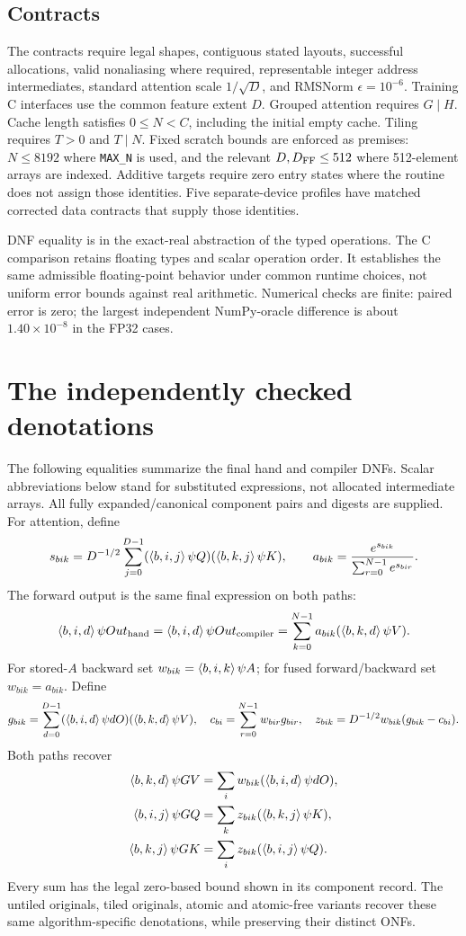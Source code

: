 \subsection{Contracts}
The contracts require legal shapes, contiguous stated layouts, successful
allocations, valid nonaliasing where required, representable integer address
intermediates, standard attention scale $1/\sqrt D$, and RMSNorm
$\epsilon=10^{-6}$. Training C interfaces use the common feature extent $D$.
Grouped attention requires $G\mid H$. Cache length satisfies $0\le N<C$,
including the initial empty cache. Tiling requires $T>0$ and $T\mid N$.
Fixed scratch bounds are enforced as premises: $N\le8192$ where \texttt{MAX\_N}
is used, and the relevant $D,D_{\rm FF}\le512$ where 512-element arrays are indexed.
Additive targets require zero entry states where the routine does not assign
those identities. Five separate-device profiles have matched corrected data
contracts that supply those identities.

DNF equality is in the exact-real abstraction of the typed operations. The C
comparison retains floating types and scalar operation order. It establishes
the same admissible floating-point behavior under common runtime choices, not
uniform error bounds against real arithmetic. Numerical checks are finite:
paired error is zero; the largest independent NumPy-oracle difference is about
$1.40\times10^{-8}$ in the FP32 cases.

\newpage\section{The independently checked denotations}
The following equalities summarize the final hand and compiler DNFs. Scalar
abbreviations below stand for substituted expressions, not allocated intermediate
arrays. All fully expanded/canonical component pairs and digests are supplied.
For attention, define
\[
 s_{bik}=D^{-1/2}\sum_{j=0}^{D-1}(\langle b,i,j\rangle\,\psi Q)(\langle b,k,j\rangle\,\psi K),
 \qquad a_{bik}=\frac{e^{s_{bik}}}{\sum_{r=0}^{N-1}e^{s_{bir}}}.
\]
The forward output is the same final expression on both paths:
\[
 \langle b,i,d\rangle\,\psi Out_{\rm hand}=\langle b,i,d\rangle\,\psi Out_{\rm compiler}
 =\sum_{k=0}^{N-1}a_{bik}(\langle b,k,d\rangle\,\psi V).
\]
For stored-$A$ backward set $w_{bik}=\langle b,i,k\rangle\,\psi A$; for fused
forward/backward set $w_{bik}=a_{bik}$. Define
\[
 g_{bik}=\sum_{d=0}^{D-1}(\langle b,i,d\rangle\,\psi dO)(\langle b,k,d\rangle\,\psi V),\quad
 c_{bi}=\sum_{r=0}^{N-1}w_{bir}g_{bir},\quad
 z_{bik}=D^{-1/2}w_{bik}(g_{bik}-c_{bi}).
\]
Both paths recover
\begin{align*}
\langle b,k,d\rangle\,\psi GV&=\sum_i w_{bik}(\langle b,i,d\rangle\,\psi dO),\\
\langle b,i,j\rangle\,\psi GQ&=\sum_k z_{bik}(\langle b,k,j\rangle\,\psi K),\\
\langle b,k,j\rangle\,\psi GK&=\sum_i z_{bik}(\langle b,i,j\rangle\,\psi Q).
\end{align*}
Every sum has the legal zero-based bound shown in its component record. The
untiled originals, tiled originals, atomic and atomic-free variants recover
these same algorithm-specific denotations, while preserving their distinct ONFs.

